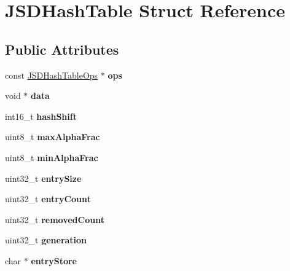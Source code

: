 \hypertarget{struct_j_s_d_hash_table}{\section{J\-S\-D\-Hash\-Table Struct Reference}
\label{struct_j_s_d_hash_table}
}
\subsection*{Public Attributes}
\begin{DoxyCompactItemize}
\item 
\hypertarget{struct_j_s_d_hash_table_a27edd8eebc5063bb5c8fb5b5aead420b}{const \hyperlink{struct_j_s_d_hash_table_ops}{J\-S\-D\-Hash\-Table\-Ops} $\ast$ {\bfseries ops}}\label{struct_j_s_d_hash_table_a27edd8eebc5063bb5c8fb5b5aead420b}

\item 
\hypertarget{struct_j_s_d_hash_table_a7a7dc027bbfb3e6d552564f30dcd4e49}{void $\ast$ {\bfseries data}}\label{struct_j_s_d_hash_table_a7a7dc027bbfb3e6d552564f30dcd4e49}

\item 
\hypertarget{struct_j_s_d_hash_table_ad4eabd9b758e660e1199075f2544621d}{int16\-\_\-t {\bfseries hash\-Shift}}\label{struct_j_s_d_hash_table_ad4eabd9b758e660e1199075f2544621d}

\item 
\hypertarget{struct_j_s_d_hash_table_a2a6cc15ba4d4c3aa7cdee8d22407602c}{uint8\-\_\-t {\bfseries max\-Alpha\-Frac}}\label{struct_j_s_d_hash_table_a2a6cc15ba4d4c3aa7cdee8d22407602c}

\item 
\hypertarget{struct_j_s_d_hash_table_a3f2d1645ca45093e6639037ca688968d}{uint8\-\_\-t {\bfseries min\-Alpha\-Frac}}\label{struct_j_s_d_hash_table_a3f2d1645ca45093e6639037ca688968d}

\item 
\hypertarget{struct_j_s_d_hash_table_ac81aef47feac468911332066c3ea725e}{uint32\-\_\-t {\bfseries entry\-Size}}\label{struct_j_s_d_hash_table_ac81aef47feac468911332066c3ea725e}

\item 
\hypertarget{struct_j_s_d_hash_table_af0c3440fcb96764fa2e63951202a4472}{uint32\-\_\-t {\bfseries entry\-Count}}\label{struct_j_s_d_hash_table_af0c3440fcb96764fa2e63951202a4472}

\item 
\hypertarget{struct_j_s_d_hash_table_afeed2337b89e4fb746faea929f65562c}{uint32\-\_\-t {\bfseries removed\-Count}}\label{struct_j_s_d_hash_table_afeed2337b89e4fb746faea929f65562c}

\item 
\hypertarget{struct_j_s_d_hash_table_af0f4db34cf8f3630e0f50f222512957b}{uint32\-\_\-t {\bfseries generation}}\label{struct_j_s_d_hash_table_af0f4db34cf8f3630e0f50f222512957b}

\item 
\hypertarget{struct_j_s_d_hash_table_a802038d8a2e3d2fa23f7c0408860fd0a}{char $\ast$ {\bfseries entry\-Store}}\label{struct_j_s_d_hash_table_a802038d8a2e3d2fa23f7c0408860fd0a}

\end{DoxyCompactItemize}


